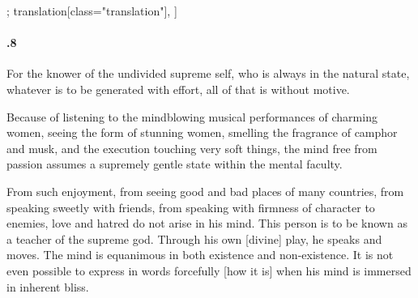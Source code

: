 \begin{alignment}[
  texts=edition[class="edition"];
  translation[class="translation"],
  ]
\begin{translation}
\begin{tlate}[58_8]
\paragraph{.8} For the knower of the undivided supreme self, who is always in the natural state, whatever is to be generated with effort, all of that is without motive.\\
\end{tlate}
\begin{tlate}[p58_03]
Because of listening to the mindblowing musical performances of charming women, seeing the form of stunning women, smelling the fragrance of camphor and musk, and the execution touching very soft things, the mind free from passion assumes a supremely gentle state within the mental faculty.

From such enjoyment, from seeing good and bad places of many countries, from speaking sweetly with friends, from speaking with firmness of character to enemies, love and hatred do not arise in his mind. This person is to be known as a teacher of the supreme god. Through his own [divine] play, he speaks and moves. The mind is equanimous in both existence and non-existence. It is not even possible to express in words forcefully [how it is] when his mind is immersed in inherent bliss.
\flushpage 
    \end{tlate}
  \end{translation}
\end{alignment}
\pagebreak %
